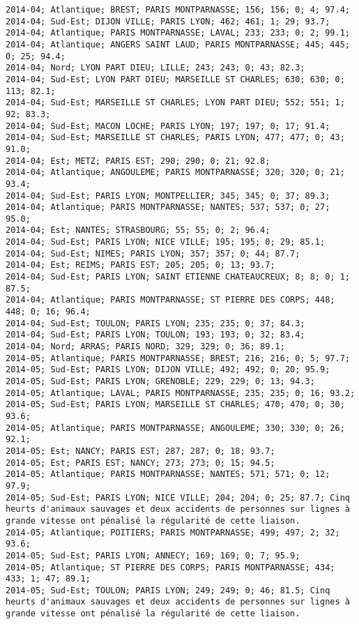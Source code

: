\documentclass{article}
\begin{document}
\begin{Verbatim}[commandchars=\\\{\}]
2014-04; Atlantique; BREST; PARIS MONTPARNASSE; 156; 156; 0; 4; 97.4; 
2014-04; Sud-Est; DIJON VILLE; PARIS LYON; 462; 461; 1; 29; 93.7; 
2014-04; Atlantique; PARIS MONTPARNASSE; LAVAL; 233; 233; 0; 2; 99.1; 
2014-04; Atlantique; ANGERS SAINT LAUD; PARIS MONTPARNASSE; 445; 445; 0; 25; 94.4; 
2014-04; Nord; LYON PART DIEU; LILLE; 243; 243; 0; 43; 82.3; 
2014-04; Sud-Est; LYON PART DIEU; MARSEILLE ST CHARLES; 630; 630; 0; 113; 82.1; 
2014-04; Sud-Est; MARSEILLE ST CHARLES; LYON PART DIEU; 552; 551; 1; 92; 83.3; 
2014-04; Sud-Est; MACON LOCHE; PARIS LYON; 197; 197; 0; 17; 91.4; 
2014-04; Sud-Est; MARSEILLE ST CHARLES; PARIS LYON; 477; 477; 0; 43; 91.0; 
2014-04; Est; METZ; PARIS EST; 290; 290; 0; 21; 92.8; 
2014-04; Atlantique; ANGOULEME; PARIS MONTPARNASSE; 320; 320; 0; 21; 93.4; 
2014-04; Sud-Est; PARIS LYON; MONTPELLIER; 345; 345; 0; 37; 89.3; 
2014-04; Atlantique; PARIS MONTPARNASSE; NANTES; 537; 537; 0; 27; 95.0; 
2014-04; Est; NANTES; STRASBOURG; 55; 55; 0; 2; 96.4; 
2014-04; Sud-Est; PARIS LYON; NICE VILLE; 195; 195; 0; 29; 85.1; 
2014-04; Sud-Est; NIMES; PARIS LYON; 357; 357; 0; 44; 87.7; 
2014-04; Est; REIMS; PARIS EST; 205; 205; 0; 13; 93.7; 
2014-04; Sud-Est; PARIS LYON; SAINT ETIENNE CHATEAUCREUX; 8; 8; 0; 1; 87.5; 
2014-04; Atlantique; PARIS MONTPARNASSE; ST PIERRE DES CORPS; 448; 448; 0; 16; 96.4; 
2014-04; Sud-Est; TOULON; PARIS LYON; 235; 235; 0; 37; 84.3; 
2014-04; Sud-Est; PARIS LYON; TOULON; 193; 193; 0; 32; 83.4; 
2014-04; Nord; ARRAS; PARIS NORD; 329; 329; 0; 36; 89.1; 
2014-05; Atlantique; PARIS MONTPARNASSE; BREST; 216; 216; 0; 5; 97.7; 
2014-05; Sud-Est; PARIS LYON; DIJON VILLE; 492; 492; 0; 20; 95.9; 
2014-05; Sud-Est; PARIS LYON; GRENOBLE; 229; 229; 0; 13; 94.3; 
2014-05; Atlantique; LAVAL; PARIS MONTPARNASSE; 235; 235; 0; 16; 93.2; 
2014-05; Sud-Est; PARIS LYON; MARSEILLE ST CHARLES; 470; 470; 0; 30; 93.6; 
2014-05; Atlantique; PARIS MONTPARNASSE; ANGOULEME; 330; 330; 0; 26; 92.1; 
2014-05; Est; NANCY; PARIS EST; 287; 287; 0; 18; 93.7; 
2014-05; Est; PARIS EST; NANCY; 273; 273; 0; 15; 94.5; 
2014-05; Atlantique; PARIS MONTPARNASSE; NANTES; 571; 571; 0; 12; 97.9; 
2014-05; Sud-Est; PARIS LYON; NICE VILLE; 204; 204; 0; 25; 87.7; Cinq heurts d'animaux sauvages et deux accidents de personnes sur lignes à grande vitesse ont pénalisé la régularité de cette liaison.
2014-05; Atlantique; POITIERS; PARIS MONTPARNASSE; 499; 497; 2; 32; 93.6; 
2014-05; Sud-Est; PARIS LYON; ANNECY; 169; 169; 0; 7; 95.9; 
2014-05; Atlantique; ST PIERRE DES CORPS; PARIS MONTPARNASSE; 434; 433; 1; 47; 89.1; 
2014-05; Sud-Est; TOULON; PARIS LYON; 249; 249; 0; 46; 81.5; Cinq heurts d'animaux sauvages et deux accidents de personnes sur lignes à grande vitesse ont pénalisé la régularité de cette liaison.

\end{Verbatim}
\end{document}

